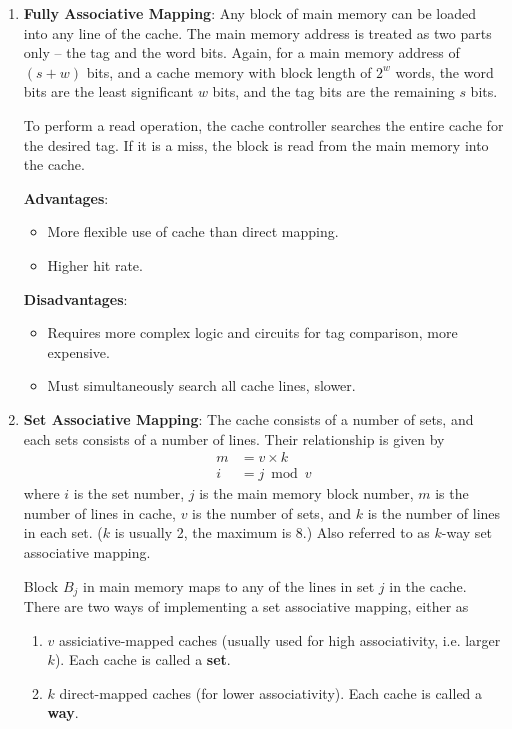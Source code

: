 \begin{enumerate}
\item \textbf{Fully Associative Mapping}:
    Any block of main memory can be loaded into any line of the cache. The main memory
    address is treated as two parts only -- the tag and the word bits. Again, for a main
    memory address of $(s+w)$ bits, and a cache memory with block length of $2^w$ words,
    the word bits are the least significant $w$ bits, and the tag bits are the remaining
    $s$ bits.

    To perform a read operation, the cache controller searches the entire cache for the
    desired tag. If it is a miss, the block is read from the main memory into the cache.

    \begin{multicols}{2}
        \textbf{Advantages}: \begin{itemize}
            \item More flexible use of cache than direct mapping.
            \item Higher hit rate.
        \end{itemize}
        \columnbreak
        \textbf{Disadvantages}: \begin{itemize}
            \item Requires more complex logic and circuits for tag comparison, more expensive.
            \item Must simultaneously search all cache lines, slower.
        \end{itemize}
    \end{multicols}

\item \textbf{Set Associative Mapping}:
    The cache consists of a number of sets, and each sets consists of a number of lines.
    Their relationship is given by
    \begin{align*}
        m &= v \times k \\
        i &= j \bmod v
    \end{align*}
    where $i$ is the set number, $j$ is the main memory block number, $m$ is the number
    of lines in cache, $v$ is the number of sets, and $k$ is the number of lines in each set.
    ($k$ is usually 2, the maximum is 8.) Also referred to as $k$-way set associative mapping.

    Block $B_j$ in main memory maps to any of the lines in set $j$ in the cache. There are
    two ways of implementing a set associative mapping, either as
    \begin{enumerate}
        \item $v$ assiciative-mapped caches 
            (usually used for high associativity, i.e. larger $k$).
            Each cache is called a \textbf{set}.
        \item $k$ direct-mapped caches (for lower associativity).
            Each cache is called a \textbf{way}.
    \end{enumerate}


\end{enumerate}
